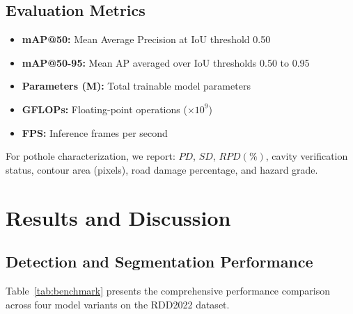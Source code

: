\documentclass[conference]{IEEEtran}
\begin{document}
\subsection{Evaluation Metrics}
\begin{itemize}[leftmargin=*]
    \item \textbf{mAP@50:} Mean Average Precision at IoU threshold 0.50
    \item \textbf{mAP@50-95:} Mean AP averaged over IoU thresholds 0.50 to 0.95
    \item \textbf{Parameters (M):} Total trainable model parameters
    \item \textbf{GFLOPs:} Floating-point operations ($\times10^9$)
    \item \textbf{FPS:} Inference frames per second
\end{itemize}

For pothole characterization, we report: $PD$, $SD$, $RPD(\%)$, cavity verification status, contour area (pixels), road damage percentage, and hazard grade.


\section{Results and Discussion}
\label{sec:results}

\subsection{Detection and Segmentation Performance}

Table~\ref{tab:benchmark} presents the comprehensive performance comparison across four model variants on the RDD2022 dataset.
\end{document}
